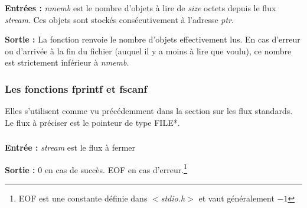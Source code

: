 \documentclass[../../../main.tex]{subfiles}
\begin{document}
\subsubsection{}
\textbf{Entrées :}\newline
\textit{nmemb} est le nombre d'objets à lire de \textit{size} octets depuis le flux \textit{stream}. Ces objets sont stockés consécutivement à l'adresse \textit{ptr}.
 
\textbf{Sortie :} La fonction renvoie le nombre d'objets effectivement lus. En cas d'erreur ou d'arrivée à la fin du fichier (auquel il y a moins à lire que voulu), ce nombre est strictement inférieur à \textit{nmemb}.
\subsubsection{Les fonctions \textsf{fprintf} et \textsf{fscanf}}
Elles s'utilisent comme vu précédemment dans la section sur les flux standards. Le flux à préciser est le pointeur de type \textsf{FILE*}.
\subsubsection{}
\textbf{Entrée :} \textit{stream} est le flux à fermer
 
\textbf{Sortie :} 0 en cas de succès. \textsf{EOF} en cas d'erreur.\footnote{\textsf{EOF} est une constante définie dans \textit{$<$stdio.h$>$} et vaut généralement $-1$}
\end{document}
